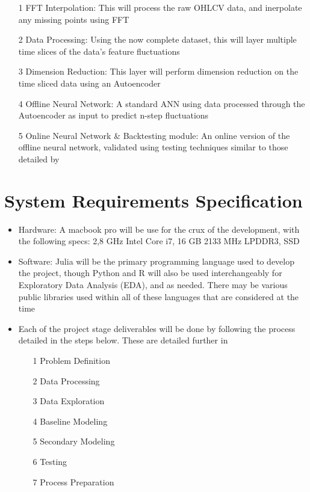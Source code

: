\documentclass[a4paper,latin]{paper}
\begin{document}
\begin{itemize}
\item[1] FFT Interpolation:
This will process the raw OHLCV data, and inerpolate any missing points using FFT
\item[2]Data Processing:
Using the now complete dataset, this will layer multiple time slices of the data's feature fluctuations  
\item[3] Dimension Reduction:
This layer will perform dimension reduction on the time sliced data using an 
Autoencoder
\item[4] Offline Neural Network:
A standard ANN using data processed through the Autoencoder as input to predict 
n-step fluctuations
\item[5] Online Neural Network \& Backtesting module:
An online version of the offline neural network, validated using testing 
techniques similar to those detailed by \cite{bailey} \cite{bailey2}
\end{itemize}


\section{System Requirements Specification}

\begin{itemize}
\item Hardware: A macbook pro will be use for the crux of the development, with the following specs:  2,8 GHz Intel Core 
i7, 16 GB 2133 MHz LPDDR3, SSD
\item Software: Julia will be the primary programming language used to develop the project, though Python and 
R will also be used interchangeably for Exploratory Data Analysis (EDA), and as needed.  
There may be various public libraries used within all of these languages that 
are considered at the time
\item Each of the project stage deliverables will be done by following the 
process detailed in the steps below. These are detailed further in \cite{technicaldoc}
\begin{itemize}
\item[1]  Problem Definition
\item[2] Data Processing
\item[3] Data Exploration
\item[4] Baseline Modeling
\item[5] Secondary Modeling
\item[6] Testing
\item[7] Process Preparation

\end{itemize}

\end{itemize}
\end{document}
